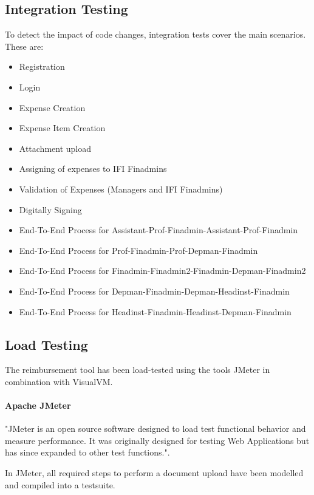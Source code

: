 \subsection{Integration Testing}
To detect the impact of code changes, integration tests cover the main scenarios. These are:
\begin{itemize}
	\item Registration
	\item Login
	\item Expense Creation
	\item Expense Item Creation
	\item Attachment upload
	\item Assigning of expenses to IFI Finadmins
	\item Validation of Expenses (Managers and IFI Finadmins)
	\item Digitally Signing
	\item End-To-End Process for Assistant-Prof-Finadmin-Assistant-Prof-Finadmin
	\item End-To-End Process for Prof-Finadmin-Prof-Depman-Finadmin
	\item End-To-End Process for Finadmin-Finadmin2-Finadmin-Depman-Finadmin2
	\item End-To-End Process for Depman-Finadmin-Depman-Headinst-Finadmin
	\item End-To-End Process for Headinst-Finadmin-Headinst-Depman-Finadmin
\end{itemize}


\subsection{Load Testing}
The reimbursement tool has been load-tested using the tools JMeter\cite{jmeter} in combination with VisualVM\cite{visualvm}.

\paragraph{Apache JMeter} "JMeter is an open source software designed to load test functional behavior and measure performance. It was originally designed for testing Web Applications but has since expanded to other test functions."\cite{jmeter}.\par

In JMeter, all required steps to perform a document upload have been modelled and compiled into a testsuite.

